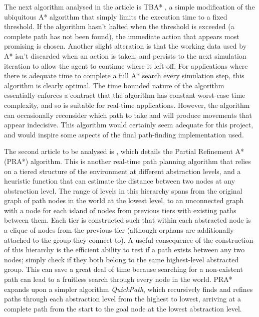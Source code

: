 \documentclass[a4paper,12pt]{article}
\begin{document}
The next algorithm analysed in the article is TBA* \cite{bjornsson09}, a simple modification of the ubiquitous A* algorithm that simply limits the execution time to a fixed threshold. If the algorithm hasn't halted when the threshold is exceeded (a complete path has not been found), the immediate action that appears most promising is chosen. Another slight alteration is that the working data used by A* isn't discarded when an action is taken, and persists to the next simulation iteration to allow the agent to continue where it left off. For applications where there is adequate time to complete a full A* search every simulation step, this algorithm is clearly optimal. The time bounded nature of the algorithm essentially enforces a contract that the algorithm has constant worst-case time complexity, and so is suitable for real-time applications. However, the algorithm can occasionally reconsider which path to take and will produce movements that appear indecisive. This algorithm would certainly seem adequate for this project, and would inspire some aspects of the final path-finding implementation used.

The second article to be analysed is , which details the Partial Refinement A* (PRA*) algorithm. This is another real-time path planning algorithm that relies on a tiered structure of the environment at different abstraction levels, and a heuristic function that can estimate the distance between two nodes at any abstraction level. The range of levels in this hierarchy spans from the original graph of path nodes in the world at the lowest level, to an unconnected graph with a node for each island of nodes from previous tiers with existing paths between them. Each tier is constructed such that within each abstracted node is a clique of nodes from the previous tier (although orphans are additionally attached to the group they connect to). A useful consequence of the construction of this hierarchy is the efficient ability to test if a path exists between any two nodes; simply check if they both belong to the same highest-level abstracted group. This can save a great deal of time because searching for a non-existent path can lead to a fruitless search through every node in the world. PRA* expands upon a simpler algorithm \emph{QuickPath}, which recursively finds and refines paths through each abstraction level from the highest to lowest, arriving at a complete path from the start to the goal node at the lowest abstraction level.
\end{document}
